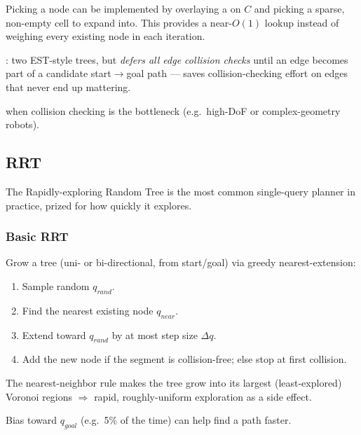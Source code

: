 \begin{notebox}
Picking a node can be implemented by overlaying a  on $C$ and picking a sparse, non-empty cell to expand into. This provides a near-$O(1)$ lookup instead of weighing every existing node in each iteration.
\end{notebox}

: two EST-style trees, but \emph{defers all edge collision checks} until an edge becomes part of a candidate start$\to$goal path — saves collision-checking effort on edges that never end up mattering.

 when collision checking is the bottleneck (e.g.\ high-DoF or complex-geometry robots).

\subsection{RRT}
The Rapidly-exploring Random Tree is the most common single-query planner in practice, prized for how quickly it explores.

\subsubsection{Basic RRT}
Grow a tree (uni- or bi-directional, from start/goal) via greedy nearest-extension:
\begin{enumerate}
\item Sample random $q_{rand}$.
\item Find the nearest existing node $q_{near}$.
\item Extend toward $q_{rand}$ by at most step size $\Delta q$.
\item Add the new node if the segment is collision-free; else stop at first collision.
\end{enumerate}
The nearest-neighbor rule makes the tree grow into its largest (least-explored) Voronoi regions $\Rightarrow$ rapid, roughly-uniform exploration as a side effect.


\begin{notebox}
Bias toward $q_{goal}$ (e.g.\ 5\% of the time) can help find a path faster.
\end{notebox}

